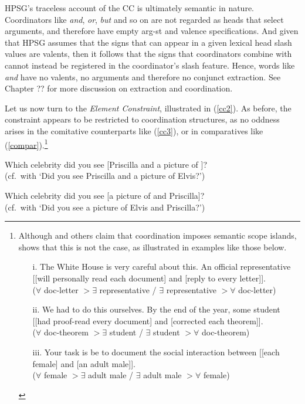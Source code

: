 \documentclass[output=paper]{langsci/langscibook}
\begin{document}
HPSG's traceless account of the CC is ultimately semantic in nature.  Coordinators like {\it and}, {\it or}, {\it but} and so on are not regarded as heads that select arguments, and therefore
have empty {\sc arg-st} and valence specifications. And given that HPSG assumes that
the signs that can appear  in a given lexical head {\sc slash} values are valents, then
it follows that the signs that coordinators combine with cannot instead be registered
in the coordinator's {\sc slash} feature. Hence, words like {\it and} have no valents, no arguments
and therefore no conjunct extraction. See Chapter ?? for more discussion on extraction and coordination.
 
Let us now turn to the {\it Element Constraint},  illustrated in (\ref{cc2}). As before, the constraint appears to be restricted to coordination structures, as no  oddness arises in the comitative counterparts like  (\ref{cc3}), or in comparatives like (\ref{compar}).\footnote{Although \citet[83]{winter01} and others claim that coordination imposes semantic scope islands, \citet[3.6]{chavesthesis} shows that this is not the case, as illustrated in examples like those below.

\begin{itemize}
\item[i.] The White House is very careful about this. An official representative [[will
              personally read each document] and [reply to every letter]].\\
              ($\forall$ doc-letter $>$$\exists$ representative / $\exists$ representative $>$$\forall$ doc-letter)

\item[ii.] We had to do this ourselves. By the end of the year,
some student [[had proof-read every document] and [corrected each
theorem]].\\
($\forall$  doc-theorem $>$$\exists$ student / $\exists$ student $>$$\forall$ doc-theorem)

\item [iii.] Your task is be to document the social interaction
between [[each female] and [an adult male]].\\
($\forall$ female $>$$\exists$ adult male / $\exists$ adult male $>$$\forall$ female)
\end{itemize}
}


 

\ea \label{cc2}
\ea  \bad{*}Which celebrity did you see [Priscilla and a picture of \spc]?\\
(cf.\ with `Did you see Priscilla and a picture of Elvis?')
\item \bad{*}Which celebrity did you see [a picture of \spc and Priscilla]?\\
(cf.\ with `Did you see a picture of Elvis and Priscilla?')
\z 
\z
\end{document}
